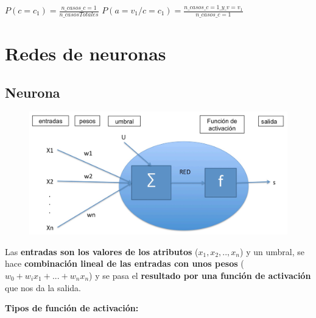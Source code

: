 \documentclass[12pt]{report} %
\begin{document}
\(P(c=c_1)= \frac {n\_casos\_c=1}{n\_casosTotales}\)
\(P(a=v_1/c=c_1)= \frac {n\_casos\_c=1\_y\_v=v_1}{n\_casos\_c=1}\)

\section{Redes de neuronas}

\subsection{Neurona}

\begin{figure}[H]
	{\includegraphics[scale=.2]{image-20210312101135112.png}}
\end{figure}
Las \textbf{entradas son los valores de los atributos}
(\(x_1,x_2,..,x_n\)) y un umbral, se hace \textbf{combinación lineal de
las entradas con unos pesos} (\(w_0+w_ix_1+...+w_nx_n\)) y se pasa el
\textbf{resultado por una función de activación} que nos da la salida.

\textbf{Tipos de función de activación:}
\end{document}
